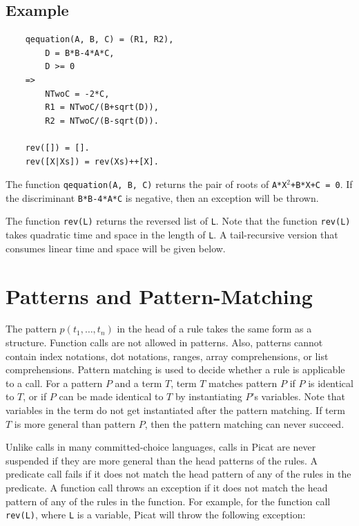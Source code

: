 \subsection*{Example}
\begin{verbatim}
    qequation(A, B, C) = (R1, R2), 
        D = B*B-4*A*C, 
        D >= 0 
    => 
        NTwoC = -2*C,
        R1 = NTwoC/(B+sqrt(D)),
        R2 = NTwoC/(B-sqrt(D)).

    rev([]) = [].
    rev([X|Xs]) = rev(Xs)++[X].
\end{verbatim}
The function \texttt{qequation(A, B, C)} returns the pair of roots of \texttt{A*X$^2$+B*X+C = 0}. If the discriminant \texttt{B*B-4*A*C} is negative, then an exception will be thrown. 

The function \texttt{rev(L)} returns the reversed list of \texttt{L}. Note that the function \texttt{rev(L)} takes quadratic time and space in the length of \texttt{L}. A tail-recursive version that consumes linear time and space will be given below.

\section{Patterns and Pattern-Matching}
The pattern $p(t_1, \ldots, t_n)$ in the head of a rule takes the same form as a structure. Function calls are not allowed in patterns. Also, patterns cannot contain index notations, dot notations, ranges, array comprehensions, or list comprehensions. Pattern matching is used to decide whether a rule is applicable to a call. For a pattern $P$ and a term $T$, term $T$ matches pattern $P$ if $P$ is identical to $T$, or if $P$ can be made identical to $T$ by instantiating $P$'s variables. Note that variables in the term do not get instantiated after the pattern matching. If term $T$ is more general than pattern $P$, then the pattern matching can never succeed.

Unlike calls in many committed-choice languages, calls in Picat are never suspended if they are more general than the head patterns of the rules. A predicate call fails if it does not match the head pattern of any of the rules in the predicate. A function call throws an exception if it does not match the head pattern of any of the rules in the function. For example, for the function call \texttt{rev(L)}, where \texttt{L} is a variable, Picat will throw the following exception:

